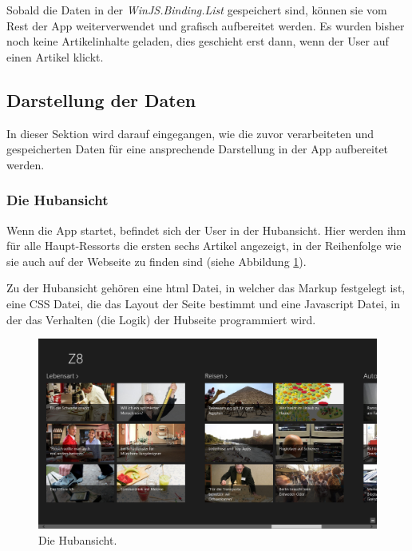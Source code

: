 \documentclass[12pt,a4paper,bibtotoc,abstracton]{scrartcl}
\begin{document}
\begin{minipage}{\linewidth}
  
\end{minipage}

Sobald die Daten in der \textit{WinJS.Binding.List} gespeichert sind, können sie vom Rest der App weiterverwendet und grafisch aufbereitet werden. Es wurden bisher noch keine Artikelinhalte geladen, dies geschieht erst dann, wenn der User auf einen Artikel klickt.

\subsection{Darstellung der Daten}
\label{subsec:darstellungderdaten}
In dieser Sektion wird darauf eingegangen, wie die zuvor verarbeiteten und gespeicherten Daten für eine ansprechende Darstellung in der App aufbereitet werden.

\subsubsection{Die Hubansicht}
\label{subsubsec:hubansicht}
Wenn die App startet, befindet sich der User in der Hubansicht. Hier werden ihm für alle Haupt-Ressorts die ersten sechs Artikel angezeigt, in der Reihenfolge wie sie auch auf der Webseite zu finden sind (siehe Abbildung \ref{fig:hubressortübersicht}).

Zu der Hubansicht gehören eine \ac{html} Datei, in welcher das Markup festgelegt ist, eine CSS Datei, die das Layout der Seite bestimmt und eine Javascript Datei, in der das Verhalten (die Logik) der Hubseite programmiert wird. 

\begin{figure}[h]
	\centering
	\includegraphics[width=\textwidth]{Bilder/Screenshots/app/reise_aegypten_2gmit.png} 
	\caption{Die Hubansicht.}
	\label{fig:hubressortübersicht}
\end{figure}
\end{document}
